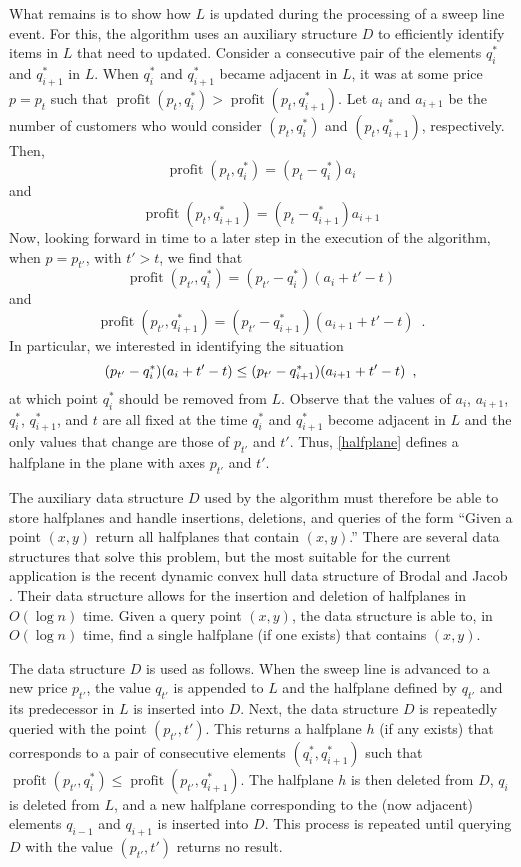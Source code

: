 \documentclass[lotsofwhite]{patmorin}
\newcommand{\val}{\operatorname{profit}}
\begin{document}
What remains is to show how $L$ is updated during the processing
of a sweep line event.  For this, the algorithm uses an auxiliary
structure $D$ to efficiently identify items in $L$ that need to updated.
Consider a consecutive pair of the elements $q^*_i$ and $q^*_{i+1}$
in $L$.  When $q^*_i$ and $q^*_{i+1}$ became adjacent in $L$, it was
at some price $p=p_t$ such that $\val(p_t,q^*_i)>\val(p_t,q^*_{i+1})$.
Let $a_i$ and $a_{i+1}$ be the number of customers who would consider
$(p_t,q^*_i)$ and $(p_t,q^*_{i+1})$, respectively. Then,
\[
  \val(p_t,q^*_i) = (p_t-q^*_i)a_i
\]
and
\[
  \val(p_t,q^*_{i+1}) = (p_t-q^*_{i+1})a_{i+1}
\]
Now, looking forward in time to a later step in the execution of
the algorithm, when $p=p_{t'}$, with $t'> t$, we find that
\[
  \val(p_{t'},q^*_i) = (p_{t'}-q^*_i)(a_i+t'-t)
\]
and
\[
  \val(p_{t'},q^*_{i+1}) = (p_{t'}-q^*_{i+1})(a_{i+1}+t'-t) \enspace .
\]
In particular, we interested in identifying the situation
\begin{equation}
  (p_{t'}-q^*_i)(a_i+t'-t) \le (p_{t'}-q^*_{i+1})(a_{i+1}+t'-t)  \enspace ,
    \eqlabel{halfplane}
\end{equation}
at which point $q^*_i$ should be removed from $L$.  Observe that
the values of $a_i$, $a_{i+1}$, $q^*_i$, $q^*_{i+1}$, and $t$ are all
fixed at the time $q^*_i$ and $q^*_{i+1}$ become adjacent in $L$ and
the only values that change are those of $p_{t'}$ and $t'$.  Thus,
\eqref{halfplane} defines a halfplane in the plane with axes
$p_{t'}$ and $t'$.

The auxiliary data structure $D$ used by the algorithm must therefore be
able to store halfplanes and handle insertions, deletions, and queries of
the form ``Given a point $(x,y)$ return all halfplanes that contain
$(x,y)$.'' There are several data structures that solve this problem, but
the most suitable for the current application is the recent dynamic convex
hull data structure of Brodal and Jacob \cite{bj02}.  Their data structure
allows for the insertion and deletion of halfplanes in $O(\log n)$ time.
Given a query point $(x,y)$, the data structure is able to, in $O(\log n)$
time, find a single halfplane (if one exists) that contains $(x,y)$.

The data structure $D$ is used as follows.  When the sweep line is
advanced to a new price $p_{t'}$, the value $q_{t'}$ is appended to
$L$ and the halfplane defined by $q_{t'}$ and its predecessor in $L$
is inserted into $D$.  Next, the data structure $D$ is repeatedly
queried with the point $(p_{t'},t')$.  This returns a halfplane
$h$ (if any exists) that corresponds to a pair of consecutive
elements $(q_i^*,q_{i+1}^*)$ such that $\val(p_{t'},q_i^*) \le
\val(p_{t'},q_{i+1}^*)$.  The halfplane $h$ is then deleted from $D$,
$q_{i}$ is deleted from $L$, and a new halfplane corresponding to the
(now adjacent) elements $q_{i-1}$ and $q_{i+1}$ is inserted into $D$.
This process is repeated until querying $D$ with the value $(p_{t'},t')$
returns no result.
\end{document}
